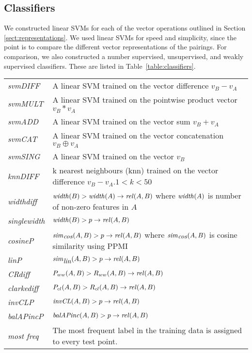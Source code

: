 \documentclass[11pt]{article}
\newcommand\invCL[1]{\mbox{\em invCL\/}(#1)}
\newcommand\simcos[1]{\mbox{\em sim\/}_{\mbox{\em cos}}(#1)}
\newcommand\simlin[1]{\mbox{\em sim\/}_{\mbox{\em lin}}(#1)}
\newcommand\width[1]{\mbox{\em width\/}(#1)}
\newcommand\balapinc[1]{\mbox{\em balAPinc\/}(#1)}
\newcommand\rel[1]{\mbox{\em rel\/}(#1)}
\begin{document}
\subsection{Classifiers}

We constructed linear SVMs for each of the vector operations outlined in Section \ref{sect:representations}.  We used linear SVMs for speed and simplicity, since the point is to compare the different vector representations of the pairings.  For comparison, we also constructed a number supervised, unsupervised, and  weakly supervised classifiers. These are listed in Table~\ref{table:classifiers}.  



\begin{table*}[ht]
\centering
\begin{tabular}{|l|p{14cm}|}
\hline
\emph{svmDIFF}& A linear SVM trained on the vector difference $v_B - v_A$\\
\emph{svmMULT}& A linear SVM trained on the pointwise product vector $v_B * v_A$\\
\emph{svmADD}& A linear SVM trained on the vector sum $v_B + v_A$\\
\emph{svmCAT}& A linear SVM trained on the vector concatenation $v_B\oplus v_A$\\
\emph{svmSING}& A linear SVM trained on the vector $v_B$\\
\emph{knnDIFF}& k nearest neighbours (knn) trained on the vector difference $v_B - v_A$.$1< k<50$\\
\hline
\emph{widthdiff}& $\width{B} > \width{A} \rightarrow\rel{A,B}$  where $\width{A}$ is  number of non-zero features in $A$\\
\emph{singlewidth}& $\width{B} > p \rightarrow \rel{A,B}$\\
\emph{cosineP}& $\simcos{A,B} > p \rightarrow\rel{A,B}$ where $\simcos{A,B}$ is cosine similarity using PPMI\\
\emph{linP}&$\simlin{A,B} > p \rightarrow\rel{A,B}$ \cite{Lin1998}\\
\emph{CRdiff}& $P_{ww}(A,B) > R_{ww}(A,B) \rightarrow\rel{A,B}$  \cite{Weeds2004}\\
\emph{clarkediff}&$P_{cl}(A,B) > R_{cl}(A,B) \rightarrow\rel{A,B}$  \cite{Clarke:09}\\
\emph{invCLP}&$\invCL{A,B} > p \rightarrow\rel{A,B}$  \cite{Lenci2012}\\
\emph{balAPincP}&$\balapinc{A,B} > p \rightarrow\rel{A,B}$ \cite{Kotlerman2010}\\
\emph{most freq}&The most frequent label in the training data is assigned to every test point.\\
\hline
\end{tabular}
\caption{Implemented classifiers}
\label{table:classifiers}
\end{table*}
\end{document}
